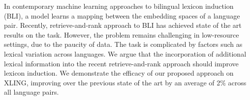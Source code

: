 In contemporary machine learning approaches to bilingual lexicon induction (BLI), a model learns a mapping between the embedding spaces of a language pair. Recently, retrieve-and-rank approach to BLI has achieved state of the art results on the task. However, the problem remains challenging in low-resource settings, due to the paucity of data. The task is complicated by factors such as lexical variation across languages. We argue that the incorporation of additional lexical information into the recent retrieve-and-rank approach should improve lexicon induction. We demonstrate the efficacy of our proposed approach on XLING, improving over the previous state of the art by an average of 2\% across all language pairs.